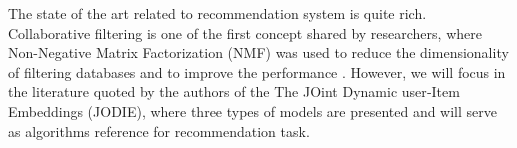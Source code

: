 {%
The state of the art related to recommendation system is quite rich. Collaborative filtering is one of the first concept shared by researchers, where Non-Negative Matrix Factorization (NMF) was used to reduce the dimensionality of filtering databases and to improve the performance \supercite{1714249}. However, we will focus in the literature quoted by the authors of the The JOint Dynamic user‐Item Embeddings (JODIE), where three types of models are presented and will serve as algorithms reference for recommendation task.
}
